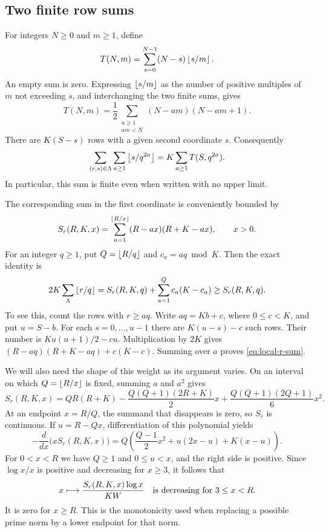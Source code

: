 \subsection{Two finite row sums}\label{supp:rows}
For integers $N\geq0$ and $m\geq1$, define
\[
 T(N,m)=\sum_{s=0}^{N-1}(N-s)\left\lfloor s/m\right\rfloor.
\]
An empty sum is zero. Expressing $\left\lfloor s/m\right\rfloor$ as the number of positive
multiples of $m$ not exceeding $s$, and interchanging the two finite sums,
gives
\begin{equation}\label{eq:T-floor}
 T(N,m)=\frac12\sum_{\substack{a\geq1\\am<N}}(N-am)(N-am+1).
\end{equation}
There are $K(S-s)$ rows with a given second coordinate $s$. Consequently
\[
 \sum_{(r,s)\in\Lambda}\sum_{a\geq1}\left\lfloor s/q^{2a}\right\rfloor
 =K\sum_{a\geq1}T(S,q^{2a}).
\]
In particular, this sum is finite even when written with no upper limit.

The corresponding sum in the first coordinate is conveniently bounded by
\begin{equation}\label{eq:Sr}
 S_r(R,K,x)=\sum_{a=1}^{\left\lfloor R/x\right\rfloor}(R-ax)(R+K-ax),\qquad x>0.
\end{equation}
For an integer $q\geq1$, put $Q=\left\lfloor R/q\right\rfloor$ and $c_a=aq\bmod K$.
Then the exact identity is
\begin{equation}\label{eq:local-r-sum}
 2K\sum_{\Lambda}\left\lfloor r/q\right\rfloor
 =S_r(R,K,q)+\sum_{a=1}^{Q}c_a(K-c_a)
 \geq S_r(R,K,q).
\end{equation}
To see this, count the rows with $r\geq aq$. Write $aq=Kb+c$, where
$0\leq c<K$, and put $u=S-b$. For each $s=0,\ldots,u-1$ there are
$K(u-s)-c$ such rows. Their number is $Ku(u+1)/2-cu$.
Multiplication by $2K$ gives
$(R-aq)(R+K-aq)+c(K-c)$. Summing over $a$ proves
\eqref{eq:local-r-sum}.

We will also need the shape of this weight as its argument varies. On an
interval on which $Q=\left\lfloor R/x\right\rfloor$ is fixed, summing $a$ and $a^2$ gives
\begin{equation}\label{eq:local-Sr-polynomial}
 S_r(R,K,x)=QR(R+K)
 -\frac{Q(Q+1)(2R+K)}2x
 +\frac{Q(Q+1)(2Q+1)}6x^2.
\end{equation}
At an endpoint $x=R/Q$, the summand that disappears is zero, so $S_r$ is
continuous. If $u=R-Qx$, differentiation of this polynomial yields
\[
 -\frac{d}{dx}\bigl(xS_r(R,K,x)\bigr)
 =Q\left(\frac{Q-1}{2}x^2+u(2x-u)+K(x-u)\right).
\]
For $0<x<R$ we have $Q\geq1$ and $0\leq u<x$, and the right side is
positive. Since $\log x/x$ is positive and decreasing for $x\geq3$, it
follows that
\begin{equation}\label{eq:local-weight-decreasing}
 x\longmapsto\frac{S_r(R,K,x)\log x}{KW}
 \quad\hbox{is decreasing for }3\leq x<R.
\end{equation}
It is zero for $x\geq R$. This is the monotonicity used when replacing a
possible prime norm by a lower endpoint for that norm.

